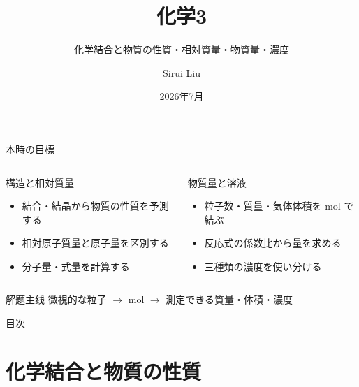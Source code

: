 \documentclass[notheorems,aspectratio=169]{beamer}
\title[EJU Chemistry]{化学3}
\subtitle{化学結合と物質の性質・相対質量・物質量・濃度}
\author[Sirui Liu]{Sirui Liu}
\date{2026年7月}
\begin{document}
\begin{frame}
  \titlepage
\end{frame}

\begin{frame}{本時の目標}
  \begin{columns}[T,onlytextwidth]
    \begin{block}{構造と相対質量}
      \begin{itemize}
        \item 結合・結晶から物質の性質を予測する
        \item 相対原子質量と原子量を区別する
        \item 分子量・式量を計算する
      \end{itemize}
    \end{block}
    \begin{exampleblock}{物質量と溶液}
      \begin{itemize}
        \item 粒子数・質量・気体体積を mol で結ぶ
        \item 反応式の係数比から量を求める
        \item 三種類の濃度を使い分ける
      \end{itemize}
    \end{exampleblock}
  \end{columns}

  \begin{alertblock}{解题主线}
    \centering
    微視的な粒子
    $\longrightarrow$
    mol
    $\longrightarrow$
    測定できる質量・体積・濃度
  \end{alertblock}
\end{frame}

\begin{frame}{目次}
  \tableofcontents
\end{frame}

\section{化学結合と物質の性質}
\end{document}
